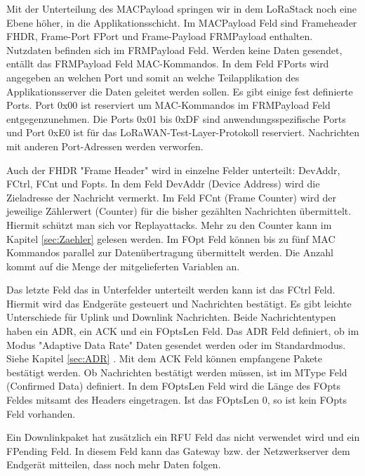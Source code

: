 \documentclass[a4paper, 12pt]{article}
\begin{document}
                Mit der Unterteilung des MACPayload springen wir in dem LoRaStack noch eine Ebene höher, in die 
                Applikationsschicht. Im MACPayload Feld sind Frameheader FHDR, Frame-Port FPort und 
                Frame-Payload FRMPayload enthalten. Nutzdaten befinden sich im FRMPayload Feld. Werden keine
                Daten gesendet, entällt das FRMPayload Feld MAC-Kommandos. In dem Feld FPorts wird 
                angegeben an welchen Port und somit an welche Teilapplikation des Applikationsserver die Daten geleitet 
                werden sollen. Es gibt einige fest definierte Ports. Port 0x00 ist reserviert um MAC-Kommandos im FRMPayload Feld 
                entgegenzunehmen. Die Ports 0x01 bis 0xDF sind anwendungsspezifische Ports und Port 0xE0 ist für das 
                LoRaWAN-Test-Layer-Protokoll reserviert. Nachrichten mit anderen Port-Adressen werden verworfen. 

                Auch der FHDR "Frame Header" wird in einzelne Felder unterteilt: DevAddr, FCtrl, FCnt und Fopts. 
                In dem Feld DevAddr (Device Address) wird die Zieladresse der Nachricht vermerkt. Im Feld FCnt 
                (Frame Counter) wird der 
                jeweilige Zählerwert (Counter) für die bisher gezählten Nachrichten übermittelt. Hiermit schützt man sich vor 
                Replayattacks. Mehr zu den Counter kann im Kapitel \ref{sec:Zaehler}  gelesen werden. Im FOpt Feld 
                können bis zu fünf MAC Kommandos parallel zur Datenübertragung übermittelt werden. Die Anzahl kommt auf die Menge der 
                mitgelieferten Variablen an. 

                Das letzte Feld das in Unterfelder unterteilt werden kann ist das FCtrl Feld. Hiermit wird das Endgeräte 
                gesteuert und Nachrichten bestätigt. Es gibt leichte Unterschiede für Uplink und Downlink 
                Nachrichten. Beide Nachrichtentypen haben ein ADR, ein ACK und ein FOptsLen Feld. Das ADR Feld definiert, 
                ob im Modus "Adaptive Data Rate" Daten gesendet werden oder im Standardmodus. Siehe Kapitel \ref{sec:ADR} . 
                Mit dem ACK Feld können empfangene Pakete bestätigt werden. Ob Nachrichten bestätigt werden müssen,
                ist im MType Feld (Confirmed Data) definiert. In dem FOptsLen Feld wird die Länge des FOpts Feldes mitsamt des 
                Headers eingetragen. Ist das FOptsLen 0, so ist kein FOpts Feld vorhanden.

                Ein Downlinkpaket hat zusätzlich ein RFU Feld das nicht verwendet wird und ein FPending Feld. In diesem 
                Feld kann das Gateway bzw. der Netzwerkserver dem Endgerät mitteilen, dass noch mehr Daten folgen.
\end{document}
